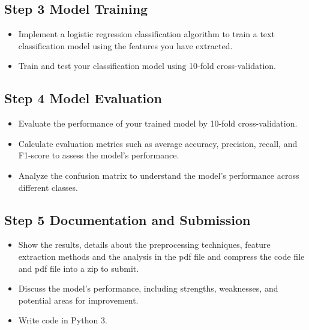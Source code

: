 \documentclass{article}
\begin{document}
\subsection*{Step 3 Model Training}
\begin{itemize}
    \item Implement a logistic regression classification algorithm to train a text classification model using the features you have extracted.
    \item Train and test your classification model using 10-fold cross-validation.
\end{itemize}

\subsection*{Step 4 Model Evaluation}
\begin{itemize}
    \item Evaluate the performance of your trained model by 10-fold cross-validation.
    \item Calculate evaluation metrics such as average accuracy, precision, recall, and F1-score to assess the model's performance.
    \item Analyze the confusion matrix to understand the model's performance across different classes.
\end{itemize}

\subsection*{Step 5 Documentation and Submission}
\begin{itemize}
    \item Show the results, details about the preprocessing techniques, feature extraction methods and the analysis in the pdf file and compress the code file and pdf file into a zip to submit.
    \item Discuss the model's performance, including strengths, weaknesses, and potential areas for improvement.
    \item Write code in Python 3.
\end{itemize}
\end{document}
